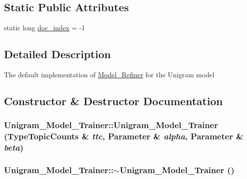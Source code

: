 \subsection*{Static Public Attributes}
\begin{DoxyCompactItemize}
\item 
static long \hyperlink{class_unigram___model___trainer_abc69c53a2021d6af93b4ccca6ee26c6c}{doc\_\-index} = -\/1
\end{DoxyCompactItemize}


\subsection{Detailed Description}
The default implementation of \hyperlink{class_model___refiner}{Model\_\-Refiner} for the Unigram model 

\subsection{Constructor \& Destructor Documentation}
\hypertarget{class_unigram___model___trainer_a7cfa7c83a6ee199e53076e58c5a46a7e}{
\subsubsection[{Unigram\_\-Model\_\-Trainer}]{\setlength{\rightskip}{0pt plus 5cm}Unigram\_\-Model\_\-Trainer::Unigram\_\-Model\_\-Trainer ({\bf TypeTopicCounts} \& {\em ttc}, \/  {\bf Parameter} \& {\em alpha}, \/  {\bf Parameter} \& {\em beta})}}
\label{class_unigram___model___trainer_a7cfa7c83a6ee199e53076e58c5a46a7e}
\hypertarget{class_unigram___model___trainer_a4e72d620af52fdfa0a239e4bb8e97608}{
\subsubsection[{$\sim$Unigram\_\-Model\_\-Trainer}]{\setlength{\rightskip}{0pt plus 5cm}Unigram\_\-Model\_\-Trainer::$\sim$Unigram\_\-Model\_\-Trainer ()}}
\label{class_unigram___model___trainer_a4e72d620af52fdfa0a239e4bb8e97608}


